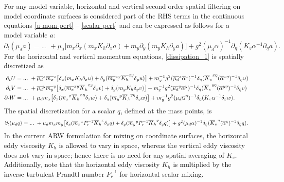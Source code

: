 For any model variable, horizontal and vertical second order spatial
filtering on model coordinate surfaces is considered part of the RHS
terms in the continuous equations 
\eqref{u-mom-pert} -- \eqref{scalar-pert}
and can be expressed as follows for
a model variable $a$:
%
\begin{equation}
\partial_t  (\mu_d a)  = ... \,\,
+ \mu_d \bigl[ m_x \partial_x(m_x K_h \partial_x  a) 
           + m_y \partial_y(m_y K_h \partial_y  a)\bigr]
+ g^2(\mu_d\alpha)^{-1} \partial_\eta(K_v \alpha^{-1} \partial_\eta  a).
\label{dissipation_1}
\end{equation}
%
For the horizontal and vertical momentum equations, 
\eqref{dissipation_1} is spatially discretized as
%
\begin{align}
\partial_t U &= ... \,\, +
{\overline{\mu_d}}^x {\overline{m_x}}^x
\bigl[ \delta_x(m_x K_h \delta_x u) 
+ \delta_y({\overline{m_y}}^{xy} {\overline{K_h}}^{xy} \delta_y u)  \bigr]
+ m_y^{-1} g^2({\overline{\mu_d}}^x {\overline\alpha}^x)^{-1} 
\delta_\eta({\overline K_v}^{x\eta} ({\overline \alpha}^{x\eta})^{-1} \delta_\eta u) 
\notag \\
%
\partial_t V &= ... \,\, +
{\overline{\mu_d}}^y {\overline{m_y}}^y
\bigl[ 
\delta_x({\overline{m_x}}^{xy} {\overline K_h}^{xy} \delta_x v)  
+\delta_y(m_y K_h \delta_y v) 
\bigr]
+ m_x^{-1} g^2({\overline{\mu_d}}^y {\overline\alpha}^y)^{-1} 
\delta_\eta({\overline K_v}^{y\eta} ({\overline \alpha}^{y\eta})^{-1} \delta_\eta v) 
\notag \\
%
\partial_t W &= ... \,\, +
\mu_d m_x
\bigl[ 
\delta_x({\overline m_x}^{x} {\overline K_h}^{x\eta} \delta_x w)  
+\delta_y({\overline m_y}^{y} {\overline K_h}^{y\eta} \delta_y w)  
\bigr]
+ m_y^{-1} g^2({\mu_d} {\overline\alpha}^\eta)^{-1} 
\delta_\eta(K_v \alpha^{-1} \delta_\eta w).
\notag
\end{align}
%
\noindent
The spatial discretization for a scalar $ q$, defined at the mass
points, is
%
\begin{equation}
\partial_t (\mu_d q) = ... \,\, +
\mu_d m_x m_y
\bigl[ 
\delta_x({\overline m_x}^{x} P_r^{-1} {\overline K_h}^{x} \delta_x  q)  
+\delta_y({\overline m_y}^{y} P_r^{-1} {\overline K_h}^{y} \delta_y  q)  
\bigr]
+ g^2({\mu_d} {\alpha})^{-1} 
\delta_\eta({\overline K_v}^\eta ({\overline \alpha}^\eta)^{-1} \delta_\eta  q). 
\notag
\end{equation}
%
\noindent
In the current ARW formulation for mixing on coordinate surfaces, the
horizontal eddy viscosity $K_h$ is allowed to vary in space, whereas the
vertical eddy viscosity does not vary in space; hence there is no need
for any spatial averaging of $K_v$.  Additionally, note that the
horizontal eddy viscosity $K_h$ is multiplied by the inverse turbulent
Prandtl number $P_r^{-1}$ for horizontal scalar mixing.

